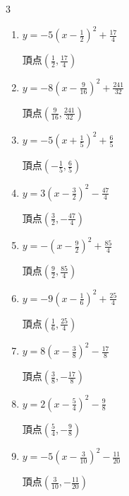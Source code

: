 \begin{multicols}{3}
\begin{enumerate}
        $\displaystyle 頂点\left( -\frac{1}{4} , -\frac{41}{8} \right)$

  \item $\displaystyle y=-5\left( x-\frac{1}{2}\right)^{2}+\frac{17}{4}$

        $\displaystyle 頂点\left( \frac{1}{2} , \frac{17}{4} \right)$

  \item $\displaystyle y=-8\left( x-\frac{9}{16}\right)^{2}+\frac{241}{32}$

        $\displaystyle 頂点\left( \frac{9}{16} , \frac{241}{32} \right)$

  \item $\displaystyle y=-5\left( x+\frac{1}{5}\right)^{2}+\frac{6}{5}$

        $\displaystyle 頂点\left( -\frac{1}{5} , \frac{6}{5} \right)$

  \item $\displaystyle y=3\left( x-\frac{3}{2}\right)^{2}-\frac{47}{4}$

        $\displaystyle 頂点\left( \frac{3}{2} , -\frac{47}{4} \right)$

\columnbreak %

\resetques

  \item $\displaystyle y=-\left( x-\frac{9}{2}\right)^{2}+\frac{85}{4}$

        $\displaystyle 頂点\left( \frac{9}{2} , \frac{85}{4} \right)$

  \item $\displaystyle y=-9\left( x-\frac{1}{6}\right)^{2}+\frac{25}{4}$

        $\displaystyle 頂点\left( \frac{1}{6} , \frac{25}{4} \right)$

  \item $\displaystyle y=8\left( x-\frac{3}{8}\right)^{2}-\frac{17}{8}$

        $\displaystyle 頂点\left( \frac{3}{8} , -\frac{17}{8} \right)$

  \item $\displaystyle y=2\left( x-\frac{5}{4}\right)^{2}-\frac{9}{8}$

        $\displaystyle 頂点\left( \frac{5}{4} , -\frac{9}{8} \right)$

  \item $\displaystyle y=-5\left( x-\frac{3}{10}\right)^{2}-\frac{11}{20}$

        $\displaystyle 頂点\left( \frac{3}{10} , -\frac{11}{20} \right)$


\end{enumerate}
\end{multicols}
